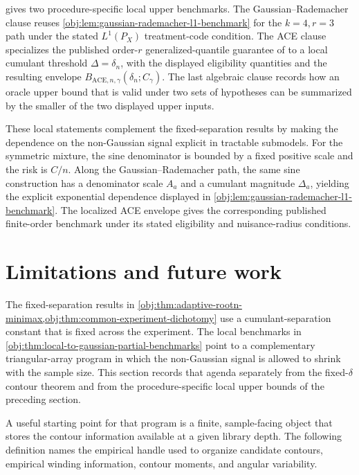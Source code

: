 \documentclass[11pt]{article}
\begin{document}
 gives two procedure-specific local upper benchmarks. The Gaussian--Rademacher clause reuses \cref{obj:lem:gaussian-rademacher-l1-benchmark} for the \(k=4,r=3\) path under the stated \(L^1(P_X)\) treatment-code condition. The ACE clause specializes the published order-\(r\) generalized-quantile guarantee of \citet{JinMackeySyrgkanis2025} to a local cumulant threshold \(\Delta=\delta_n\), with the displayed eligibility quantities and the resulting envelope \(B_{\mathrm{ACE},n,\gamma}(\delta_n;C_{\gamma})\). The last algebraic clause records how an oracle upper bound that is valid under two sets of hypotheses can be summarized by the smaller of the two displayed upper inputs.

These local statements complement the fixed-separation results by making the dependence on the non-Gaussian signal explicit in tractable submodels. For the symmetric mixture, the sine denominator is bounded by a fixed positive scale and the risk is \(C/n\). Along the Gaussian--Rademacher path, the same sine construction has a denominator scale \(A_a\) and a cumulant magnitude \(\Delta_a\), yielding the explicit exponential dependence displayed in \cref{obj:lem:gaussian-rademacher-l1-benchmark}. The localized ACE envelope gives the corresponding published finite-order benchmark under its stated eligibility and nuisance-radius conditions.


\section{Limitations and future work}

The fixed-separation results in \cref{obj:thm:adaptive-rootn-minimax,obj:thm:common-experiment-dichotomy} use a cumulant-separation constant that is fixed across the experiment. The local benchmarks in \cref{obj:thm:local-to-gaussian-partial-benchmarks} point to a complementary triangular-array program in which the non-Gaussian signal is allowed to shrink with the sample size. This section records that agenda separately from the fixed-\(\delta\) contour theorem and from the procedure-specific local upper bounds of the preceding section.

A useful starting point for that program is a finite, sample-facing object that stores the contour information available at a given library depth. The following definition names the empirical handle used to organize candidate contours, empirical winding information, contour moments, and angular variability.
\end{document}
